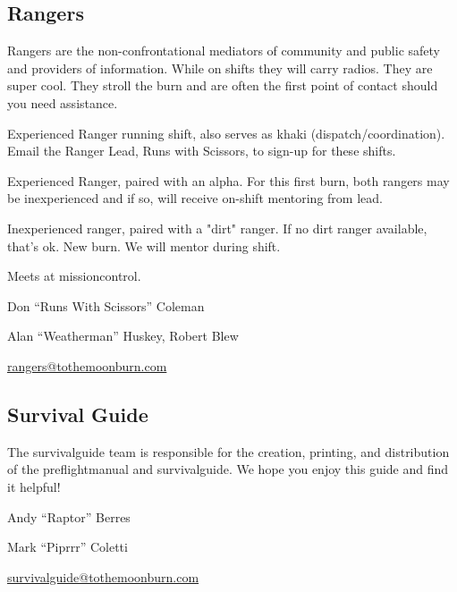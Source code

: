 \newpage
\subsection*{Rangers}
Rangers are the non-confrontational mediators of community and public safety and providers of information. While on shifts they will carry radios. They are super cool. They stroll the burn and are often the first point of contact should you need assistance.

\begin{addmargin}[.3cm]{0cm}
\begin{description}[noitemsep]
	\item[Khaki:] Experienced Ranger running shift, also serves as khaki (dispatch/coordination). Email the Ranger Lead, Runs with Scissors, to sign-up for these shifts.
	\item[Dirt Patrol:] Experienced Ranger, paired with an alpha. For this first burn, both rangers may be inexperienced and if so, will receive on-shift mentoring from lead.
	\item[Alpha:] Inexperienced ranger, paired with a "dirt" ranger. If no dirt ranger available, that's ok. New burn. We will mentor during shift.
\end{description}
\end{addmargin}

Meets at \gls{missioncontrol}.
\begin{description}[leftmargin=6em,noitemsep,style=nextline]
   \item[Lead:] Don ``Runs With Scissors'' Coleman
   \item[Co-leads:] Alan ``Weatherman'' Huskey, Robert Blew
   \item[Contact:] \url{rangers@tothemoonburn.com}
\end{description}


\subsection*{Survival Guide}
\label{sec:survivalguide}
The \gls{survivalguide} team is responsible for the creation, printing, and distribution of the \gls{preflightmanual} and \gls{survivalguide}. We hope you enjoy this guide and find it helpful!

\begin{description}[leftmargin=6em,noitemsep,style=nextline]
   \item[Lead:] Andy ``Raptor'' Berres
   \item[Co-leads:] Mark ``Piprrr'' Coletti
   \item[Contact:] \url{survivalguide@tothemoonburn.com}
\end{description}


